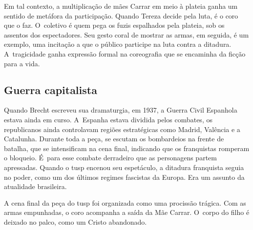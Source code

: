 
Em tal contexto, a multiplicação de mães Carrar em meio à plateia
ganha um sentido de metáfora da participação. Quando Tereza decide pela
luta, é o coro que o faz. O~coletivo é quem pega os fuzis espalhados
pela plateia, sob os assentos dos espectadores. Seu gesto coral de
mostrar as armas, em seguida, é um exemplo, uma incitação a que o
público participe na luta contra a ditadura. A~tragicidade ganha
expressão formal na coreografia que se encaminha da ficção para a vida.


\subsection{Guerra capitalista}

Quando Brecht escreveu sua dramaturgia, em 1937, a Guerra Civil
Espanhola estava ainda em curso. A~Espanha estava dividida pelos
combates, os republicanos ainda controlavam regiões estratégicas como
Madrid, Valência e a Catalunha. Durante toda a peça, se escutam os
bombardeios na frente de batalha, que se intensificam na cena final,
indicando que os franquistas romperam o bloqueio. É~para esse combate
derradeiro que as personagens partem apressadas. Quando o {\sc tusp} encenou
seu espetáculo, a ditadura franquista
seguia no poder, como um dos últimos regimes fascistas da Europa. Era um
assunto da atualidade brasileira.

A cena final da peça do {\sc tusp} foi organizada como uma procissão
trágica. Com as armas empunhadas, o coro acompanha a saída da Mãe
Carrar. O~corpo do filho é deixado no palco, como um Cristo abandonado.

